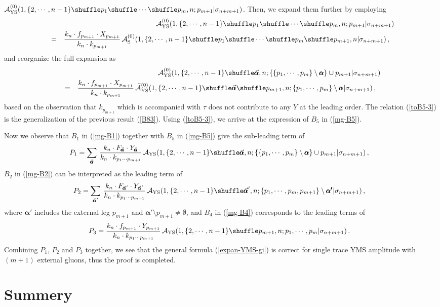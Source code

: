 \documentclass[11pt,a4paper]{article}
\newcommand{\bea}{\begin{eqnarray}}
\newcommand{\eea}{\end{eqnarray}}
\newcommand{\nn}{\nonumber \\}
\def\W #1{\widetilde{#1}}
\def\eref#1{(\ref{#1})}
\def\a{{\alpha}}
\begin{document}
${\cal A}^{(0)}_{\rm YS}(1,\{2,\cdots,n-1\}\shuffle p_1\shuffle\cdots\shuffle p_m,n;p_{m+1}|\sigma_{n+m+1})$. Then, we expand them further by employing
%
\bea
& &{\cal A}^{(0)}_{\rm YS}(1,\{2,\cdots,n-1\}\shuffle p_1\shuffle\cdots\shuffle p_m,n;p_{m+1}|\sigma_{n+m+1})\nn
&=&{k_n\cdot f_{p_{m+1}}\cdot X_{p_{m+1}}\over k_n\cdot k_{p_{m+1}}}\,{\cal A}^{(0)}_{\rm S}(1,\{2,\cdots,n-1\}\shuffle p_1\shuffle\cdots\shuffle p_m\shuffle p_{m+1},n|\sigma_{n+m+1})\,,~~\label{toB5-2}
\eea
%
and reorganize the full expansion as
%
\bea
& &{\cal A}^{(0)}_{\rm YS}(1,\{2,\cdots,n-1\}\shuffle\vec{\pmb{\a}},n;\{\{p_1,\cdots,p_m\}\setminus\pmb{\a}\}\cup p_{m+1}|\sigma_{n+m+1})\nn
&=&{k_n\cdot f_{p_{m+1}}\cdot X_{p_{m+1}}\over k_n\cdot k_{p_{m+1}}}\,\W{\cal A}^{(0)}_{\rm YS}(1,\{2,\cdots,n-1\}\shuffle\vec{\pmb{\a}}\shuffle p_{m+1},n;\{p_1,\cdots,p_m\}\setminus\pmb{\a}|\sigma_{n+m+1})\,,~~\label{toB5-3}
\eea
%
based on the observation that $k_{p_{m+1}}$ which is accompanied with $\tau$ does not contribute to any $Y$ at the leading order.
The relation \eref{toB5-3} is the generalization of the previous result \eref{B83}.
Using \eref{toB5-3}, we arrive at the expression of $B_5$ in \eref{mg-B5}.

Now we observe that $B_1$ in \eref{mg-B1} together with $B_5$ in \eref{mg-B5} give the sub-leading term of
%
\bea
P_1=\sum_{\vec{\pmb{\a}}}\,{k_n\cdot F_{\vec{\pmb{\a}}}\cdot Y_{\vec{\pmb{\a}}}\over k_n\cdot k_{p_1\cdots p_{m+1}}}\,
{\cal A}_{\rm YS}(1,\{2,\cdots,n-1\}\shuffle\vec{\pmb{\a}},n;\{\{p_1,\cdots,p_m\}\setminus\pmb{\a}\}\cup p_{m+1}|\sigma_{n+m+1})\,,~~\label{mg-P1}
\eea
%
$B_2$ in \eref{mg-B2} can be interpreted as the leading term of
%
\bea
P_2=\sum_{\vec{\pmb{\a}}'}\,{k_n\cdot F_{\vec{\pmb{\a}}'}\cdot Y_{\vec{\pmb{\a}}'}\over k_n\cdot k_{p_1\cdots p_{m+1}}}\,
{\cal A}_{\rm YS}(1,\{2,\cdots,n-1\}\shuffle\vec{\pmb{\a}}',n;\{p_1,\cdots,p_m,p_{m+1}\}\setminus\pmb{\a'}|\sigma_{n+m+1})\,,~~\label{mg-P2}
\eea
%
where $\pmb{\a}'$ includes the external leg $p_{m+1}$ and $\pmb{\a}'\setminus p_{m+1}\neq\emptyset$, and $B_4$ in \eref{mg-B4} corresponds to the leading terms of
%
\bea
P_3={k_n\cdot f_{p_{m+1}}\cdot Y_{p_{m+1}}\over k_n\cdot k_{p_1\cdots p_{m+1}}}\,{\cal A}_{\rm YS}(1,\{2,\cdots,n-1\}\shuffle p_{m+1},n;p_1,\cdots,p_m|\sigma_{n+m+1})\,.~~\label{mg-P3}
\eea
%
Combining $P_1$, $P_2$ and $P_3$ together, we see that the general formula \eref{expan-YMS-gi} is correct for single trace YMS amplitude with $(m+1)$
external gluons, thus the proof is completed.


\section{Summery}
\label{sec-conclusion}
\end{document}
